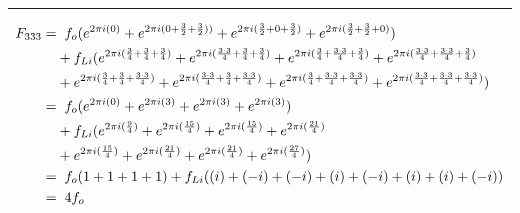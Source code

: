\documentclass{article}
\begin{document}
\noindent\rule{12cm}{0.4pt}
\begin{align*}
	F_{333} =& \hspace{0.2cm}  f_{o}  (e^{2 \pi i (0)} 
	+ e^{2 \pi i (0 + \frac{3}{2} + \frac{3}{2}))} 
	+ e^{2 \pi i (\frac{3}{2} + 0 + \frac{3}{2})} 
	+ e^{2 \pi i (\frac{3}{2} + \frac{3}{2} + 0)})  \\
	&+ f_{Li} (e^{2 \pi i (\frac{3}{4} + \frac{3}{4} + \frac{3}{4})}  
	+ e^{2 \pi i (\frac{3 \cdot 3}{4} + \frac{3}{4} + \frac{3}{4})} 
	+ e^{2 \pi i (\frac{3}{4} + \frac{3 \cdot 3}{4} + \frac{3}{4})} 
	+ e^{2 \pi i (\frac{3 \cdot 3}{4} + \frac{3 \cdot 3}{4} + \frac{3}{4})} \\
	&+ e^{2 \pi i (\frac{3}{4} + \frac{3}{4} + \frac{3 \cdot 3}{4})}
	+ e^{2 \pi i (\frac{3 \cdot 3}{4} + \frac{3}{4} + \frac{3 \cdot 3}{4})} 
	+ e^{2 \pi i (\frac{3}{4} + \frac{3 \cdot 3}{4} + \frac{3 \cdot 3}{4})} 
	+ e^{2 \pi i (\frac{3 \cdot 3}{4} + \frac{3 \cdot 3}{4} + \frac{3 \cdot 3}{4})}) \\  
	=& \hspace{0.2cm}  f_{o}  (e^{2 \pi i (0)} 
	+ e^{2 \pi i (3)} 
	+ e^{2 \pi i (3)} 
	+ e^{2 \pi i (3)})  \\
	&+ f_{Li} (e^{2 \pi i (\frac{9}{4})}  
	+ e^{2 \pi i (\frac{15}{4})} 
	+ e^{2 \pi i (\frac{15}{4})} 
	+ e^{2 \pi i (\frac{21}{4})} \\
	&+ e^{2 \pi i (\frac{15}{4})}
	+ e^{2 \pi i (\frac{21}{4})} 
	+ e^{2 \pi i (\frac{21}{4})} 
	+ e^{2 \pi i (\frac{27}{4})}) \\
	=& \hspace{0.2cm}  f_{o}  (1  + 1 + 1 + 1) + f_{Li}((i) + (-i) + (-i) + (i) + (-i) + (i) + (i) + (-i)) \\
	=& \hspace{0.2cm} 4f_{o} 
\end{align*}
\end{document}
